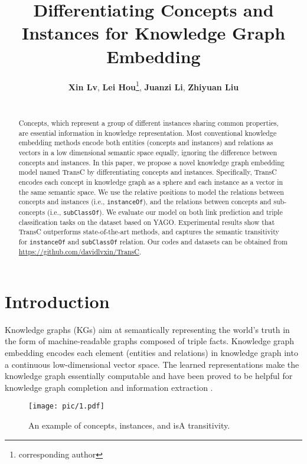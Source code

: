 \documentclass[11pt,a4paper]{article}
\title{Differentiating Concepts and Instances for Knowledge Graph Embedding}
\author{
    \textbf{Xin Lv}, \textbf{Lei Hou}\thanks{corresponding author}, \textbf{Juanzi Li}, \textbf{Zhiyuan Liu}\\
    \affaddr{Department of Computer Science and Technology,\\
    Tsinghua University, China 100084}\\
    \email{\{lv-x18@mails.,houlei@,lijuanzi@,liuzy@\}tsinghua.edu.cn}
    }
\date{}
\begin{document}
  \maketitle
  \begin{abstract}
    Concepts, which represent a group of different instances sharing common properties, are essential information
    in knowledge representation. Most conventional knowledge embedding methods encode both entities (concepts and instances) and relations 
    as vectors in a low dimensional semantic space equally, ignoring the difference between concepts and instances. 
    In this paper, we propose a novel knowledge graph embedding model named TransC by differentiating concepts and 
    instances. Specifically, TransC encodes each concept in knowledge graph as a sphere and each instance as a 
    vector in the same semantic space. We use the relative positions to model the relations between concepts and 
    instances (i.e., \texttt{instanceOf}), and the relations between concepts and sub-concepts (i.e., \texttt{subClassOf}). We evaluate 
    our model on both link prediction and triple classification tasks on the dataset based on YAGO. Experimental results 
    show that TransC outperforms state-of-the-art methods, and captures the semantic transitivity for \texttt{instanceOf} 
    and \texttt{subClassOf} relation. Our codes and datasets can be obtained from \url{https://github.com/davidlvxin/TransC}.
  \end{abstract}
  
  \section{Introduction}
  
  Knowledge graphs (KGs) aim at semantically representing the world's truth in the form of machine-readable graphs 
  composed of triple facts. Knowledge graph embedding encodes each element (entities and relations) 
  in knowledge graph into a continuous low-dimensional vector space. The learned representations make the knowledge graph 
  essentially computable and have been proved to be helpful for knowledge graph completion and 
  information extraction \cite{TransE,TransH,TransR,TransD,TranSparse}.
  
  \begin{figure}[ht]
    \centering
    \setlength{\abovecaptionskip}{2pt}
    \setlength{\belowcaptionskip}{0pt}
    \texttt{[image: pic/1.pdf]}
    \caption{An example of concepts, instances, and isA transitivity.} 
    \label{fig_intro}
    \end{figure}
   
\end{document}
